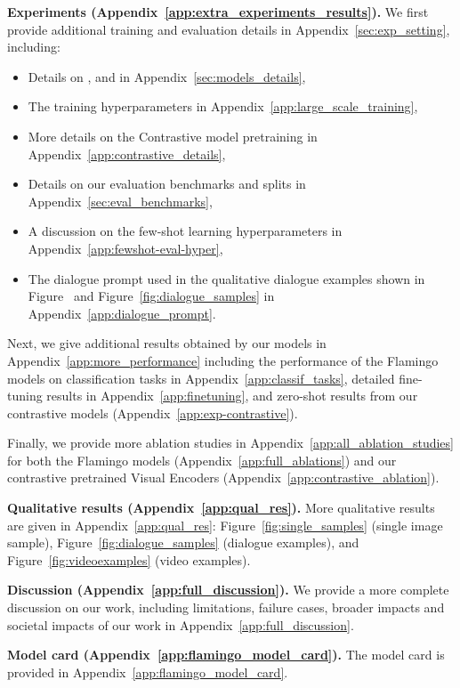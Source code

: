 \noindent
\textbf{Experiments (Appendix~\ref{app:extra_experiments_results}).}
We first provide additional training and evaluation details in Appendix~\ref{sec:exp_setting}, including:
\begin{itemize}
    \item Details on \base, \medium{} and \largem{} in Appendix~\ref{sec:models_details},
    \item The training hyperparameters in Appendix~\ref{app:large_scale_training},
    \item More details on the Contrastive model pretraining in Appendix~\ref{app:contrastive_details},
    \item Details on our evaluation benchmarks and splits in Appendix~\ref{sec:eval_benchmarks},
    \item A discussion on the few-shot learning hyperparameters in Appendix~\ref{app:fewshot-eval-hyper},
    \item The dialogue prompt used in the qualitative dialogue examples shown in Figure~ and Figure~\ref{fig:dialogue_samples} in Appendix~\ref{app:dialogue_prompt}.
\end{itemize}

Next, we give additional results obtained by our models in Appendix~\ref{app:more_performance} including the performance of the Flamingo models on classification tasks in Appendix~\ref{app:classif_tasks}, detailed fine-tuning results in Appendix~\ref{app:finetuning}, and zero-shot results from our contrastive models (Appendix~\ref{app:exp-contrastive}).

Finally, we provide more ablation studies in Appendix~\ref{app:all_ablation_studies} for both the Flamingo models (Appendix~\ref{app:full_ablations}) and our contrastive pretrained Visual Encoders (Appendix~\ref{app:contrastive_ablation}).

\noindent
\textbf{Qualitative results (Appendix~\ref{app:qual_res}).} More qualitative results are given in Appendix~\ref{app:qual_res}: Figure~\ref{fig:single_samples} (single image sample), Figure~\ref{fig:dialogue_samples} (dialogue examples), and Figure~\ref{fig:videoexamples} (video examples).

\noindent
\textbf{Discussion (Appendix~\ref{app:full_discussion}).}
We provide a more complete discussion on our work, including limitations, failure cases, broader impacts and societal impacts of our work in Appendix~\ref{app:full_discussion}.


\noindent
\textbf{Model card (Appendix~\ref{app:flamingo_model_card}).}
The \largem{} model card is provided in Appendix~\ref{app:flamingo_model_card}.

